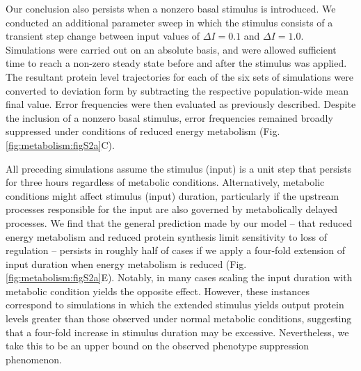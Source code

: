 Our conclusion also persists when a nonzero basal stimulus is introduced. We conducted an additional parameter sweep in which the stimulus consists of a transient step change between input values of $\Delta I=0.1$ and $\Delta I=1.0$. Simulations were carried out on an absolute basis, and were allowed sufficient time to reach a non-zero steady state before and after the stimulus was applied. The resultant protein level trajectories for each of the six sets of simulations were converted to deviation form by subtracting the respective population-wide mean final value. Error frequencies were then evaluated as previously described. Despite the inclusion of a nonzero basal stimulus, error frequencies remained broadly suppressed under conditions of reduced energy metabolism (Fig. \ref{fig:metabolism:figS2a}C).

All preceding simulations assume the stimulus (input) is a unit step that persists for three hours regardless of metabolic conditions. Alternatively, metabolic conditions might affect stimulus (input) duration, particularly if the upstream processes responsible for the input are also governed by metabolically delayed processes. We find that the general prediction made by our model -- that reduced energy metabolism and reduced protein synthesis limit sensitivity to loss of regulation -- persists in roughly half of cases if we apply a four-fold extension of input duration when energy metabolism is reduced (Fig. \ref{fig:metabolism:figS2a}E). Notably, in many cases scaling the input duration with metabolic condition yields the opposite effect. However, these instances correspond to simulations in which the extended stimulus yields output protein levels greater than those observed under normal metabolic conditions, suggesting that a four-fold increase in stimulus duration may be excessive. Nevertheless, we take this to be an upper bound on the observed phenotype suppression phenomenon.

